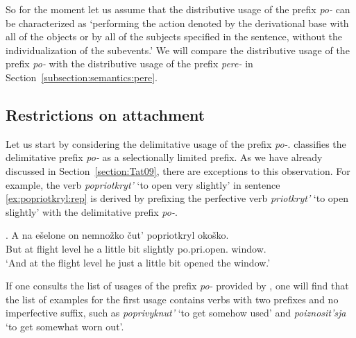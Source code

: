 So for the moment let us assume that the distributive usage of the prefix \textit{po-} can be characterized as `performing the action denoted by the derivational base with all of the objects or by all of the subjects specified in the sentence, without the individualization of the subevents.' We will compare the distributive usage of the prefix \textit{po-} with the distributive usage of the prefix \textit{pere-} in Section~\ref{subsection:semantics:pere}.

\subsection{Restrictions on attachment} 
Let us start by considering the delimitative usage of the prefix \textit{po-}. \citet{Tatevosov:09} classifies the delimitative prefix \textit{po-} as a selectionally limited prefix. As we have already discussed in Section~\ref{section:Tat09}, there are exceptions to this observation. For example, the verb \textit{popriotkryt'} `to open very slightly' in sentence \ref{ex:popriotkryl:rep} is derived by prefixing the perfective verb \textit{priotkryt'} `to open slightly' with the delimitative prefix \textit{po-}.

\exg. \label{ex:popriotkryl:rep}A na e\v{s}elone on nemno\v{z}ko \v{c}ut' popriotkryl oko\v{s}ko.\\
But at {flight level} he {a little bit} {slightly} po.pri.open. window.\\
\trans `And at the flight level he just a little bit opened the window.'\\

If one consults the list of usages of the prefix \textit{po-} provided by \citet{Shvedova:82}, one will find that the list of examples for the first usage contains verbs with two prefixes and no imperfective suffix, such as \textit{poprivyknut'} `to get somehow used' and \textit{poiznosit'sja} `to get somewhat worn out'. 


